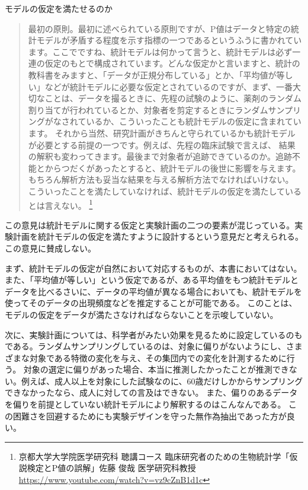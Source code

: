 \begin{SMbox}{モデルの仮定を満たせるのか}
    \ 
    \begin{quote}
    最初の原則。最初に述べられている原則ですが、P値はデータと特定の統計モデルが矛盾する程度を示す指標の一つであるというふうに書かれています。ここでですね、統計モデルは何かって言うと、統計モデルは必ず一連の仮定のもとで構成されています。どんな仮定かと言いますと、統計の教科書をみますと、「データが正規分布している」とか、「平均値が等しい」などが統計モデルに必要な仮定とされているのですが、まず、一番大切なことは、データを撮るときに、先程の試験のように、薬剤のランダム割り当てが行われているとか、対象者を剪定するときにランダムサンプリングがなされているか、こういったことも統計モデルの仮定に含まれています。
    それから当然、研究計画がきちんと守られているかも統計モデルが必要とする前提の一つです。例えば、先程の臨床試験で言えば、
    結果の解釈も変わってきます。最後まで対象者が追跡できているのか。追跡不能とからつだくがあったとすると、統計モデルの後世に影響を与えます。もちろん解析方法も妥当な結果を与える解析方法でなければいけない。
    こういったことを満たしていなければ、統計モデルの仮定を満たしているとは言えない。
    \footnote{京都大学大学院医学研究科 聴講コース 臨床研究者のための生物統計学「仮説検定とP値の誤解」佐藤 俊哉 医学研究科教授 \url{https://www.youtube.com/watch?v=vz9cZnB1d1c} }
    \end{quote}

    この意見は統計モデルに関する仮定と実験計画の二つの要素が混じっている。実験計画を統計モデルの仮定を満たすように設計するという意見だと考えられる。
    この意見に賛成しない。

     まず、統計モデルの仮定が自然において対応するものが、本書においてはない。また、「平均値が等しい」という仮定であるが、ある平均値をもつ統計モデルとデータを比べるさいに、データの平均値が異なる場合においても、統計モデルを使ってそのデータの出現頻度などを推定することが可能である。
     このことは、モデルの仮定をデータが満たさなければならないことを示唆していない。

     次に、実験計画については、科学者がみたい効果を見るために設定しているのもである。ランダムサンプリングしているのは、対象に偏りがないようにし、さまざまな対象である特徴の変化を与え、その集団内での変化を計測するために行う。
     対象の選定に偏りがあった場合、本当に推測したかったことが推測できない。例えば、成人以上を対象にした試験なのに、60歳だけしかからサンプリングできなかったなら、成人に対しての言及はできない。
     また、偏りのあるデータを偏りを前提としていない統計モデルにより解釈するのはこんなんである。
     この困難さを回避するためにも実験デザインを守った無作為抽出であった方が良い。
     


\end{SMbox}
